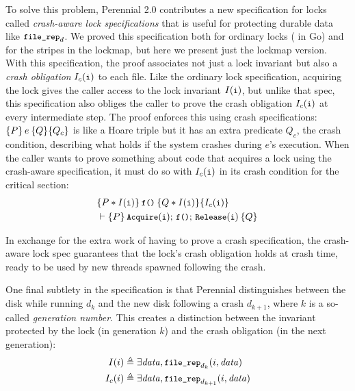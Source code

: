 To solve this problem, Perennial 2.0 contributes a new
specification for locks called \emph{crash-aware lock specifications}
that is useful for protecting durable data like $\cc{file_rep}_{d}$. We proved
this specification both for ordinary locks ( in Go) and
for the stripes in the lockmap, but here we present just the lockmap version.
With this specification, the
proof associates not just a lock invariant but also a \emph{crash obligation} $I_c(\cc{i})$ to each file. Like the ordinary
lock specification, acquiring the lock gives the caller access to the lock
invariant $I(\cc{i})$, but unlike that spec, this specification also obliges the
caller to prove the crash obligation $I_c(\cc{i})$ at every intermediate step. The proof
enforces this using crash specifications:
$\hoareC{P}{e}{Q}{Q_{c}}$ is like a Hoare triple but it has an extra predicate
$Q_{c}$, the crash condition, describing what holds if the system crashes during $e$'s execution.
When the caller wants to prove something about code that acquires a lock using
the crash-aware specification, it must do so with $I_c(\cc{i})$ in its crash
condition for the critical section:
%
\begin{align*}
&\hoareC{P \sep I(\cc{i})}{\cc{f()}}{Q \sep I(\cc{i})}{I_c(\cc{i})} \\
&\vdash \hoare{P}{\cc{Acquire}(\cc{i});\, \cc{f()};\, \cc{Release}(\cc{i})}{Q}
\end{align*}

In exchange for the extra work of having to prove a crash specification, the crash-aware
lock spec guarantees
that the lock's crash obligation holds at crash time, ready to be
used by new threads spawned following the crash.

One final subtlety in the specification is that Perennial distinguishes between
the disk while running $d_{k}$ and the new disk following a crash $d_{k+1}$,
where $k$ is a so-called \emph{generation number}. This creates a distinction
between the invariant protected by the lock (in generation $k$) and the crash
obligation (in the next generation):
\begin{align*}
  I(i) &\triangleq \exists \mathit{data}, \cc{file_rep}_{d_{k}}(i, \mathit{data}) \\
  I_c(i) &\triangleq \exists \mathit{data}, \cc{file_rep}_{d_{k+1}}(i, \mathit{data})
\end{align*}

